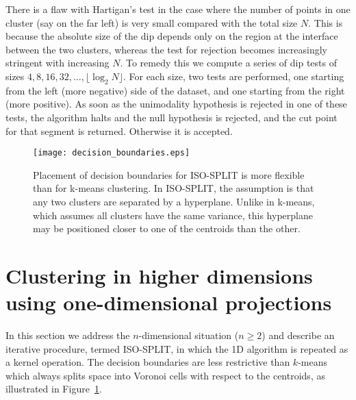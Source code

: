 \documentclass[10pt]{article}
\begin{document}
There is a flaw with Hartigan's test in the case where the number of points in one cluster (say on the far left) is very small compared with the total size $N$. This is because the absolute size of the dip depends only on the region at the interface between the two clusters, whereas the test for rejection becomes increasingly stringent with increasing $N$. To remedy this we compute a series of dip tests of sizes $4,8,16,32,\dots,\lfloor\log_2 N\rfloor$. For each size, two tests are performed, one starting from the left (more negative) side of the dataset, and one starting from the right (more positive). As soon as the unimodality hypothesis is rejected in one of these tests, the algorithm halts and the null hypothesis is rejected, and the cut point for that segment is returned. Otherwise it is accepted.

\begin{figure}
\begin{center}
\texttt{[image: decision\_boundaries.eps]}
\end{center}
\caption{
Placement of decision boundaries for ISO-SPLIT is more flexible than for k-means clustering. In ISO-SPLIT, the assumption is that any two clusters are separated by a hyperplane. Unlike in k-means, which assumes all clusters have the same variance, this hyperplane may be positioned closer to one of the centroids than the other.
}
\label{fig:decision_boundaries}
\end{figure}

\section {Clustering in higher dimensions using one-dimensional projections}

\label{isosplit-algorithm}

In this section we address the $n$-dimensional situation ($n\geq2$) and describe an iterative procedure, termed ISO-SPLIT, in which the 1D algorithm is repeated as a kernel operation. The decision boundaries are less restrictive than $k$-means which always splits space into Voronoi cells with respect to the centroids, as illustrated in Figure~\ref{fig:decision_boundaries}.
\end{document}
